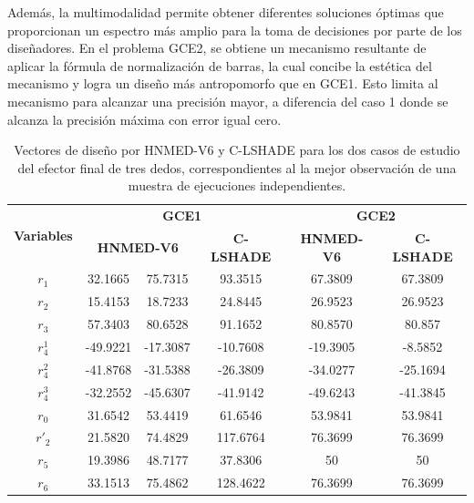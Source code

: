  Además, la multimodalidad permite obtener diferentes soluciones óptimas que proporcionan un espectro más amplio para la toma de decisiones por parte de los diseñadores. En el problema GCE2, se obtiene un mecanismo resultante de aplicar la fórmula de normalización de barras, la cual concibe la estética del mecanismo y logra un diseño más antropomorfo que en GCE1. Esto limita al mecanismo para alcanzar una precisión mayor, a diferencia del caso 1 donde se alcanza la precisión máxima con error igual cero.
\begin{table}
	\centering
	\caption{Vectores de diseño por HNMED-V6 y C-LSHADE para los dos casos de estudio del efector final de tres dedos, correspondientes al la mejor observación de una muestra de ejecuciones independientes.} \label{Vectores de diseño por HNMED-V6 y C-LSHADE para los dos casos de estudio del efector final de tres dedos, correspondientes al la mejor observación de la muestra.}
	\begin{tabular}{|c|c|c|c|c|c|} 
		\hline
			\multirow{2}{*}{\textbf{Variables}} & \multicolumn{3}{c|}{\textbf{GCE1}} & \multicolumn{2}{c|}{\textbf{GCE2}}   \\ 
		\cline{2-6}
	                &\multicolumn{2}{c|}{\textbf{HNMED-V6}}&\textbf{ C-LSHADE   }&\textbf{ HNMED-V6    } & \textbf{C-LSHADE     }\\ 
		\hline
		$r_1$        & 32.1665 &75.7315 &93.3515    & 67.3809  & 67.3809      \\ 
		\hline
		$r_2$        & 15.4153  &18.7233& 24.8445    & 26.9523  & 26.9523      \\ 
		\hline
		$r_3$        & 57.3403  &80.6528 &91.1652    & 80.8570  & 80.857       \\ 
		\hline
		$r^1_4$       & -49.9221&-17.3087&-10.7608   & -19.3905 & -8.5852      \\ 
		\hline
		$r^2_4$       & -41.8768  &-31.5388& -26.3809   & -34.0277 & -25.1694     \\ 
		\hline
		$r^3_4$       & -32.2552 &-45.6307 &-41.9142   & -49.6243 & -41.3845     \\ 
		\hline
		$r_0$        & 31.6542  &53.4419&61.6546    & 53.9841  & 53.9841      \\ 
		\hline
		$r'_2$       & 21.5820  &74.4829&117.6764   & 76.3699   & 76.3699      \\ 
		\hline
		$r_5$        & 19.3986  &48.7177 &37.8306    & 50           & 50           \\ 
		\hline
		$r_6$        & 33.1513  &75.4862&128.4622   & 76.3699   & 76.3699      \\ 

\end{tabular}
\end{table}
